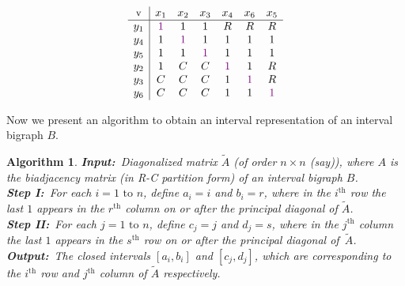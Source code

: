 \documentclass[secthm]{elsart}
\newtheorem{algo}[thm]{Algorithm}
\begin{document}
\begin{exmp}
$$\begin{array}{c|cccccc}
\textrm{\small v} & x_1 & x_2 & x_3 & x_4 & x_6 & x_5\\
\hline
y_1 & \textcolor{darkmagenta}{1} & 1 & 1 & R & R & R \\
y_4 & 1 & \textcolor{darkmagenta}{1} & 1 & 1 & 1 & 1 \\
y_5 & 1 & 1 & \textcolor{darkmagenta}{1} & 1 & 1 & 1 \\
y_2 & 1 & C & C & \textcolor{darkmagenta}{1} & 1 & R \\
y_3 & C & C & C & 1 & \textcolor{darkmagenta}{1} & R \\
y_6 & C & C & C & 1 & 1 & \textcolor{darkmagenta}{1}
\end{array}$$
\end{exmp}

\vspace{-1em}Now we present an algorithm to obtain an interval representation of an interval bigraph $B$.

\begin{algo} \label{alg:big1}
{\em {\small\bf Input:}\ Diagonalized matrix $\tilde{A}$ (of order $n\times n$ (say)), where $A$ is the biadjacency matrix (in R-C partition form) of an interval bigraph $B$.\\
{\small\bf Step I:}\ For each $i=1\textrm{ to }n$, define $a_i=i$ and $b_i=r$, where in the $i^{\textrm{th}}$ row the last $1$ appears in the $r^{\textrm{th}}$ column on or after the principal diagonal of $\tilde{A}$.\\
{\small\bf Step II:}\ For each $j=1\textrm{ to }n$, define $c_j=j$ and $d_j=s$, where in the $j^{\textrm{th}}$ column the last $1$ appears in the $s^{\textrm{th}}$ row on or after the principal diagonal  \mbox{of $\tilde{A}$}.\\
{\small\bf Output:}\ The closed intervals $[a_i,b_i]$ and $[c_j,d_j]$, which are corresponding to the $i^{\textrm{th}}$ row and $j^{\textrm{th}}$ column of $\tilde{A}$ respectively.}
\end{algo}
\end{document}
